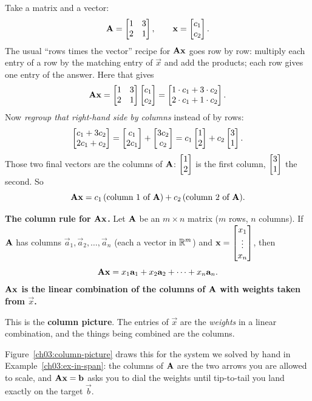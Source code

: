 Take a matrix and a vector:
\[
  \mathbf{A} = \begin{bmatrix} 1 & 3 \\ 2 & 1 \end{bmatrix}, \qquad \mathbf{x} = \begin{bmatrix}c_1 \\ c_2\end{bmatrix}.
\]
The usual ``rows times the vector'' recipe for $\mathbf{A}\mathbf{x}$ goes row by row: multiply each entry of a row by the matching entry of $\vec{x}$ and add the products; each row gives one entry of the answer. Here that gives
\[
  \mathbf{A}\mathbf{x}
  = \begin{bmatrix} 1 & 3 \\ 2 & 1 \end{bmatrix}\begin{bmatrix}c_1\\c_2\end{bmatrix}
  = \begin{bmatrix}1\cdot c_1 + 3\cdot c_2 \\ 2\cdot c_1 + 1\cdot c_2\end{bmatrix}.
\]
Now \emph{regroup that right-hand side by columns} instead of by rows:
\[
  \begin{bmatrix}c_1 + 3c_2 \\ 2c_1 + c_2\end{bmatrix}
  = \begin{bmatrix}c_1 \\ 2c_1\end{bmatrix} + \begin{bmatrix}3c_2 \\ c_2\end{bmatrix}
  = c_1\begin{bmatrix}1\\2\end{bmatrix} + c_2\begin{bmatrix}3\\1\end{bmatrix}.
\]
Those two final vectors are the columns of $\mathbf{A}$: $\begin{bmatrix}1\\2\end{bmatrix}$ is the first column, $\begin{bmatrix}3\\1\end{bmatrix}$ the second. So
\[
  \mathbf{A}\mathbf{x} = c_1\,(\text{column 1 of }\mathbf{A}) + c_2\,(\text{column 2 of }\mathbf{A}).
\]

\begin{formalbox}
\textbf{The column rule for $\mathbf{A}\mathbf{x}$.} Let $\mathbf{A}$ be an $m\times n$ matrix ($m$ rows, $n$ columns). If $\mathbf{A}$ has columns $\vec{a}_1,\vec{a}_2,\dots,\vec{a}_n$ (each a vector in $\mathbb{R}^m$) and $\mathbf{x} = \begin{bmatrix}x_1\\ \vdots \\ x_n\end{bmatrix}$, then
\[
  \mathbf{A}\mathbf{x} = x_1\mathbf{a}_1 + x_2\mathbf{a}_2 + \cdots + x_n\mathbf{a}_n.
\]
\textbf{$\mathbf{A}\mathbf{x}$ is the linear combination of the columns of $\mathbf{A}$ with weights taken from $\vec{x}$.}
\end{formalbox}

This is the \textbf{column picture}. The entries of $\vec{x}$ are the \emph{weights} in a linear combination, and the things being combined are the columns.

Figure~\ref{ch03:column-picture} draws this for the system we solved by hand in Example~\ref{ch03:ex-in-span}: the columns of $\mathbf{A}$ are the two arrows you are allowed to scale, and $\mathbf{A}\mathbf{x}=\mathbf{b}$ asks you to dial the weights until tip-to-tail you land exactly on the target $\vec{b}$.

